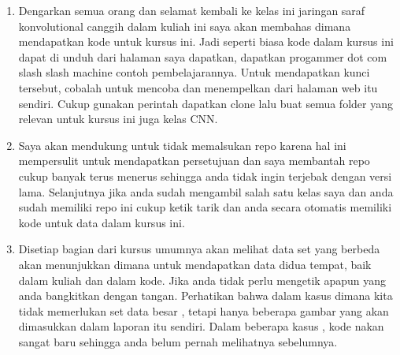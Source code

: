 \begin{enumerate}
\item Dengarkan semua orang dan selamat kembali ke kelas ini jaringan saraf konvolutional canggih dalam kuliah ini saya akan membahas dimana mendapatkan kode untuk kursus ini. Jadi seperti biasa kode dalam kursus ini dapat di unduh dari halaman saya dapatkan, dapatkan progammer dot com slash slash machine contoh pembelajarannya. Untuk mendapatkan kunci tersebut, cobalah untuk mencoba dan menempelkan dari halaman web itu sendiri. Cukup gunakan perintah dapatkan clone lalu buat semua folder yang relevan untuk kursus ini juga kelas CNN.
\item Saya akan mendukung untuk tidak memalsukan repo karena hal ini mempersulit untuk mendapatkan persetujuan dan saya membantah repo cukup banyak terus menerus sehingga anda tidak ingin terjebak dengan versi lama. Selanjutnya jika anda sudah mengambil salah satu kelas saya dan anda sudah memiliki repo ini cukup ketik tarik dan anda secara otomatis memiliki kode untuk data dalam kursus ini.
\item Disetiap bagian dari kursus umumnya akan melihat data set yang berbeda akan menunjukkan dimana untuk mendapatkan data didua tempat, baik dalam kuliah dan dalam kode. Jika anda tidak perlu mengetik apapun yang anda bangkitkan dengan tangan. Perhatikan bahwa dalam kasus dimana kita tidak memerlukan set data besar , tetapi hanya beberapa gambar yang akan dimasukkan dalam laporan itu sendiri. Dalam beberapa kasus , kode nakan sangat baru sehingga anda belum pernah melihatnya sebelumnya.
\end{enumerate}


